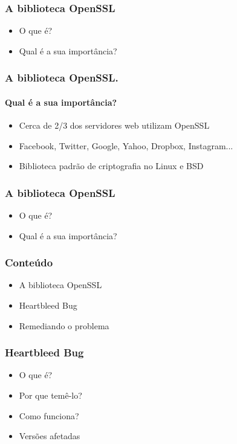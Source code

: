 \documentclass{beamer}
\begin{document}
\begin{frame}
	\frametitle{A biblioteca OpenSSL}
	\begin{itemize}
		\item \textcolor{covered}{O que é?}
		\item Qual é a sua importância?
	\end{itemize}
\end{frame}

\begin{frame}
	\frametitle{A biblioteca OpenSSL.}
	\framesubtitle{Qual é a sua importância?}
	\begin{itemize}
		\item Cerca de 2/3 dos servidores web utilizam OpenSSL
		\item Facebook, Twitter, Google, Yahoo, Dropbox, Instagram...
		\item Biblioteca padrão de criptografia no Linux e BSD
	\end{itemize}
\end{frame}

\begin{frame}
	\frametitle{A biblioteca OpenSSL}
	\begin{itemize}
		\item \textcolor{covered}{O que é?}
		\item \textcolor{covered}{Qual é a sua importância?}
	\end{itemize}
\end{frame}

\begin{frame}
	\frametitle{Conteúdo}
	\begin{itemize}
		\item \textcolor{covered}{A biblioteca OpenSSL}
		\item Heartbleed Bug
		\item Remediando o problema
	\end{itemize}
\end{frame}

\begin{frame}
	\frametitle{Heartbleed Bug}
	\begin{itemize}
		\item O que é?
		\item Por que temê-lo?
		\item Como funciona?
		\item Versões afetadas
	\end{itemize}
\end{frame}
\end{document}
